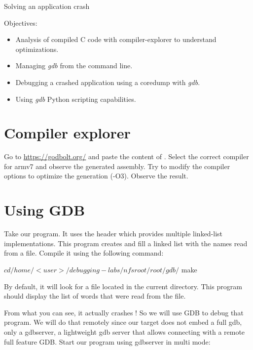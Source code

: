 \subchapter
{Solving an application crash}
{Objectives:
  \begin{itemize}
    \item Analysis of compiled C code with compiler-explorer to understand
          optimizations.
    \item Managing {\em gdb} from the command line.
    \item Debugging a crashed application using a coredump with {\em gdb}.
    \item Using {\em gdb} Python scripting capabilities.
  \end{itemize}
}

\section{Compiler explorer}

Go to \url{https://godbolt.org/} and paste the content of .
Select the correct compiler for armv7 and observe the generated assembly. Try
to modify the compiler options to optimize the generation (-O3). Observe the
result.

\section{Using GDB}

Take our  program. It uses the  header
which provides multiple linked-list implementations. This program creates and
fill a linked list with the names read from a file. Compile it using the
following command:

\begin{bashinput}
$ cd /home/<user>/debugging-labs/nfsroot/root/gdb/
$ make
\end{bashinput}

By default, it will look for a  file located in the current
directory. This program should display the list of words that were read from
the file.


From what you can see, it actually crashes ! So we will use GDB to debug that
program. We will do that remotely since our target does not embed a full gdb,
only a gdbserver, a lightweight gdb server that allows connecting with a remote
full feature GDB. Start our program using gdbserver in multi mode:

